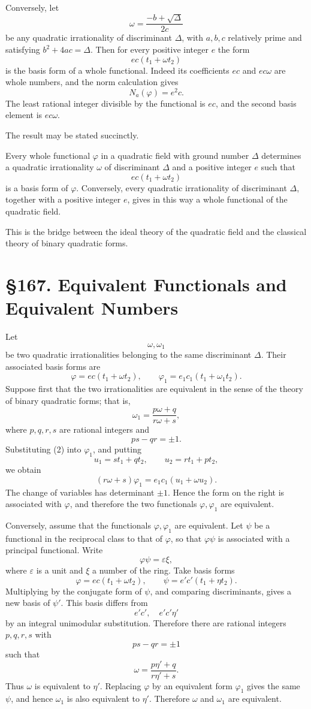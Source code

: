 \documentclass[11pt,a4paper]{book}
\newcommand{\webersection}[2]{\clearpage\section*{\S #1. #2}}
\newcommand{\eps}{\varepsilon}
\begin{document}
Conversely, let
\[
  \omega=\frac{-b+\sqrt\Delta}{2c}
\]
be any quadratic irrationality of discriminant \(\Delta\), with \(a,b,c\) relatively prime and satisfying \(b^2+4ac=\Delta\).  Then for every positive integer \(e\) the form
\[
  ec(t_1+\omega t_2)
\tag{8}
\]
is the basis form of a whole functional.  Indeed its coefficients \(ec\) and \(ec\omega\) are whole numbers, and the norm calculation gives
\[
  N_a(\varphi)=e^2c.
\tag{9}
\]
The least rational integer divisible by the functional is \(ec\), and the second basis element is \(ec\omega\).

The result may be stated succinctly.

Every whole functional \(\varphi\) in a quadratic field with ground number \(\Delta\) determines a quadratic irrationality \(\omega\) of discriminant \(\Delta\) and a positive integer \(e\) such that
\[
  ec(t_1+\omega t_2)
\tag{10}
\]
is a basis form of \(\varphi\).  Conversely, every quadratic irrationality of discriminant \(\Delta\), together with a positive integer \(e\), gives in this way a whole functional of the quadratic field.

This is the bridge between the ideal theory of the quadratic field and the classical theory of binary quadratic forms.

\webersection{167}{Equivalent Functionals and Equivalent Numbers}

Let
\[
  \omega,\omega_1
\]
be two quadratic irrationalities belonging to the same discriminant \(\Delta\).  Their associated basis forms are
\[
  \varphi=ec(t_1+\omega t_2),\qquad
  \varphi_1=e_1c_1(t_1+\omega_1 t_2).
\tag{1}
\]
Suppose first that the two irrationalities are equivalent in the sense of the theory of binary quadratic forms; that is,
\[
  \omega_1=\frac{p\omega+q}{r\omega+s},
\tag{2}
\]
where \(p,q,r,s\) are rational integers and
\[
  ps-qr=\pm1.
\tag{3}
\]
Substituting (2) into \(\varphi_1\), and putting
\[
  u_1=st_1+qt_2,\qquad u_2=rt_1+pt_2,
\]
we obtain
\[
  (r\omega+s)\varphi_1=e_1c_1(u_1+\omega u_2).
\tag{4}
\]
The change of variables has determinant \(\pm1\).  Hence the form on the right is associated with \(\varphi\), and therefore the two functionals \(\varphi,\varphi_1\) are equivalent.

Conversely, assume that the functionals \(\varphi,\varphi_1\) are equivalent.  Let \(\psi\) be a functional in the reciprocal class to that of \(\varphi\), so that \(\varphi\psi\) is associated with a principal functional.  Write
\[
  \varphi\psi=\eps\xi,
\tag{5}
\]
where \(\eps\) is a unit and \(\xi\) a number of the ring.  Take basis forms
\[
  \varphi=ec(t_1+\omega t_2),\qquad
  \psi=e'c'(t_1+\eta t_2).
\tag{6}
\]
Multiplying by the conjugate form of \(\psi\), and comparing discriminants, gives a new basis of \(\psi'\).  This basis differs from
\[
  e'c',\quad e'c'\eta'
\]
by an integral unimodular substitution.  Therefore there are rational integers \(p,q,r,s\) with
\[
  ps-qr=\pm1
\tag{7}
\]
such that
\[
  \omega=\frac{p\eta'+q}{r\eta'+s}.
\tag{8}
\]
Thus \(\omega\) is equivalent to \(\eta'\).  Replacing \(\varphi\) by an equivalent form \(\varphi_1\) gives the same \(\psi\), and hence \(\omega_1\) is also equivalent to \(\eta'\).  Therefore \(\omega\) and \(\omega_1\) are equivalent.
\end{document}
